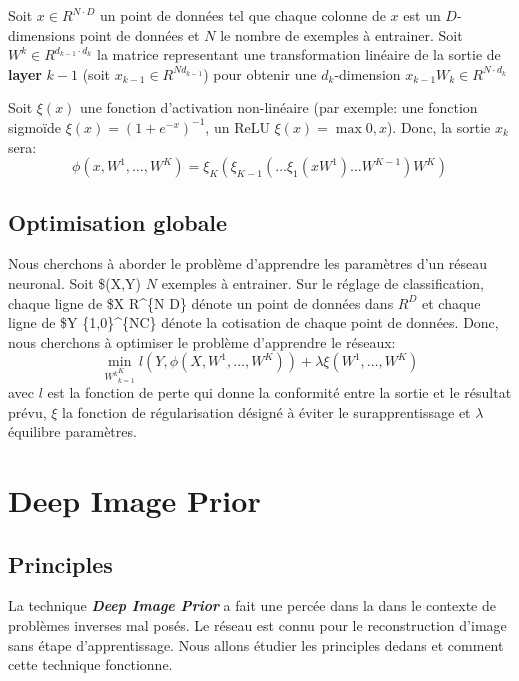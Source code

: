\documentclass[
  11pt,
  dvipsnames]{article}
\begin{document}
Soit \(x \in R^{N \cdot D}\) un point de données tel que chaque colonne de \(x\) est un \(D\)-dimensions point de données et \(N\) le nombre de exemples à entrainer. Soit \(W^k \in R^{d_{k-1} \cdot d_k}\) la matrice representant une transformation linéaire de la sortie de \textbf{layer} \(k-1\) (soit \(x_{k-1} \in R ^{Nd_{k-1}}\)) pour obtenir une \(d_k\)-dimension \(x_{k-1}W_{k} \in R^{N \cdot d_{k}}\)

Soit \(\xi(x)\) une fonction d'activation non-linéaire (par exemple: une fonction sigmoïde \(\xi(x) = (1+e^{-x})^{-1}\), un ReLU \(\xi(x) = \max{0,x}\)). Donc, la sortie \(x_k\) sera:
\[\phi (x, W^1, \dots, W^K)=\xi_K(\xi_{K-1}(\dots \xi_1(xW^1)\dots W^{K-1})W^K)\]

\hypertarget{optimisation-globale}{%
\subsection{Optimisation globale}\label{optimisation-globale}}

Nous cherchons à aborder le problème d'apprendre les paramètres d'un réseau neuronal. Soit \$(X,Y) \(N\) exemples à entrainer. Sur le réglage de classification, chaque ligne de \$X \in R\^{}\{N \cdot D\} dénote un point de données dans \(R^D\) et chaque ligne de \$Y \in \{1,0\}\^{}\{N\cdot C\} dénote la cotisation de chaque point de données. Donc, nous cherchons à optimiser le problème d'apprendre le réseaux:
\[\min_{{W^k}_{k=1}^K} l(Y,\phi(X,W^1,\dots,W^K))+\lambda \xi(W^1,\dots,W^K)\] avec \(l\) est la fonction de perte qui donne la conformité entre la sortie et le résultat prévu, \(\xi\) la fonction de régularisation désigné à éviter le surapprentissage et \(\lambda\) équilibre paramètres.

\newpage

\hypertarget{deep-image-prior}{%
\section{Deep Image Prior}\label{deep-image-prior}}

\hypertarget{principles}{%
\subsection{Principles}\label{principles}}

La technique \textbf{\emph{Deep Image Prior}} a fait une percée dans la dans le contexte
de problèmes inverses mal posés. Le réseau est connu pour le reconstruction d'image sans étape d'apprentissage. Nous allons étudier les principles dedans et comment cette technique fonctionne.
\end{document}
